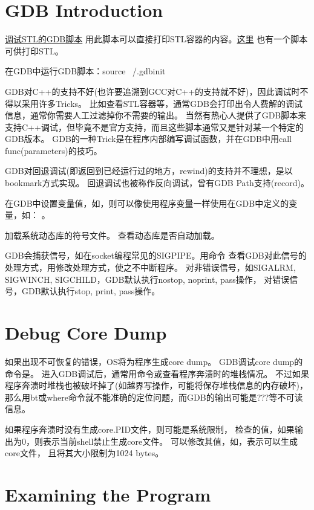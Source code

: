 \section{GDB Introduction}
\noindent\href{http://www.yolinux.com/TUTORIALS/GDB-Commands.html}{调试STL的GDB脚本}
用此脚本可以直接打印STL容器的内容。\href{http://www.stanford.edu/~afn/gdb\_stl\_utils/}{这里}
也有一个脚本可供打印STL。

在GDB中运行GDB脚本：source ~/.gdbinit

GDB对C++的支持不好(也许要追溯到GCC对C++的支持就不好)，因此调试时不得以采用许多Tricks。
比如查看STL容器等，通常GDB会打印出令人费解的调试信息，通常你需要人工过滤掉你不需要的输出。
当然有热心人提供了GDB脚本来支持C++调试，但毕竟不是官方支持，而且这些脚本通常又是针对某一个特定的GDB版本。
GDB的一种Trick是在程序内部编写调试函数，并在GDB中用call func(parameters)的技巧。

GDB对回退调试(即返回到已经运行过的地方，rewind)的支持并不理想，是以bookmark方式实现。
回退调试也被称作反向调试，曾有GDB Path支持(record)。

在GDB中设置变量值，如，则可以像使用程序变量一样使用在GDB中定义的变量，如：
。

加载系统动态库的符号文件。
查看动态库是否自动加载。

GDB会捕获信号，如在socket编程常见的SIGPIPE。用命令
查看GDB对此信号的处理方式，用修改处理方式，使之不中断程序。
对非错误信号，如SIGALRM, SIGWINCH, SIGCHILD，GDB默认执行nostop, noprint, pass操作，
对错误信号，GDB默认执行stop, print, pass操作。

\section{Debug Core Dump}
如果出现不可恢复的错误，OS将为程序生成core dump。
GDB调试core dump的命令是。
进入GDB调试后，通常用命令或查看程序奔溃时的堆栈情况。
不过如果程序奔溃时堆栈也被破坏掉了(如越界写操作，可能将保存堆栈信息的内存破坏)，
那么用bt或where命令就不能准确的定位问题，而GDB的输出可能是???等不可读信息。

如果程序奔溃时没有生成core.PID文件，则可能是系统限制，
检查的值，如果输出为0，则表示当前shell禁止生成core文件。
可以修改其值，如，表示可以生成core文件，
且将其大小限制为1024 bytes。

\section{Examining the Program}
